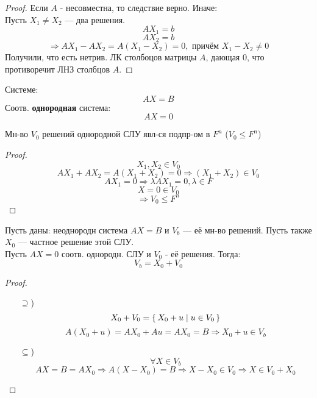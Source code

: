 \begin{proof}
Если $A$ - несовместна, то следствие верно. Иначе: \\
Пусть $X_1 \neq X_2$ --- два решения. 
\[
AX_1 = b
\]
\[
AX_2 = b
\]
\[
\Rightarrow AX_1 - AX_2 = A(X_1 - X_2) = 0, \text{ причём } X_1 - X_2 \neq 0
\]
Получили, что есть нетрив. ЛК столбоцов матрицы $A$, дающая 0, что противоречит ЛНЗ столбцов $A$.
\end{proof}
\begin{definition}
Системе:
\[
AX = B
\]
Соотв. \textbf{однородная} система:
\[
AX = 0
\]
\end{definition}
\begin{statement}
Мн-во $V_0$ решений однородной СЛУ явл-ся подпр-ом в $F^{n}$ ($V_0 \leq F^{n}$)
\end{statement}
\begin{proof}
\[
X_1, X_2 \in V_0
\]
\[
AX_1 + AX_2 = A(X_1 + X_2) = 0 \Rightarrow (X_1 + X_2) \in V_0
\]
\[
AX_1 = 0 \Rightarrow \lambda A X_1 = 0, \lambda \in F 
\]
\[
X = 0 \in V_0
\]
\[
\Rightarrow V_0 \leq F^{n}
\]
\end{proof}
\begin{statement}
Пусть даны: неоднородн система $AX = B$ и $V_b$ --- её мн-во решений. Пусть также $X_0$ --- частное решение этой СЛУ. \\
Пусть $AX = 0$ соотв. однородн. СЛУ и $V_0$ - её решения. Тогда:
\[
V_b = X_0 + V_0
\]
\end{statement}
\begin{proof}
\begin{itemize}
  \item [$\supseteq$)] \[
  X_0 + V_0 = \set{X_0 + u | u \in V_0}
  \]
  \[
  A(X_0 + u) = AX_0 + Au = AX_0 = B \Rightarrow X_0 + u \in V_b
  \]
\item [$\subseteq$)] \[
\forall X \in V_b
\]
\[
AX = B = AX_0 \Rightarrow A(X - X_0) = B \Rightarrow X - X_0 \in V_0 \Rightarrow X \in V_0 + X_0
\]
\end{itemize}
\end{proof}
